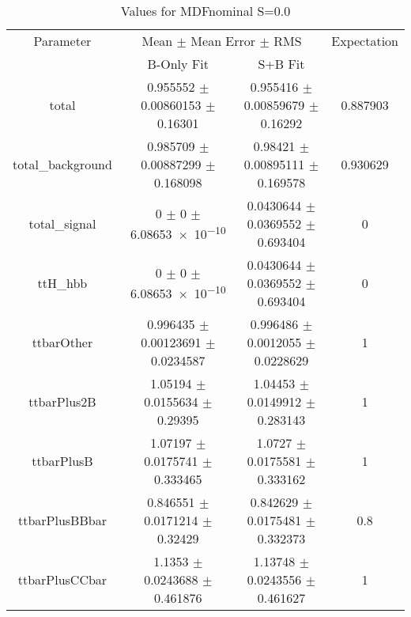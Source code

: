 \begin{table}
\centering
\caption{Values for MDFnominal S=0.0}
\begin{tabular}{cccc}
\toprule
Parameter & \multicolumn{2}{c}{Mean $\pm$ Mean Error $\pm$ RMS} & Expectation\\
 & B-Only Fit & S+B Fit & \\
\midrule
total & \num{0.955552} $\pm$ \num{0.00860153} $\pm$ \num{0.16301} & \num{0.955416} $\pm$ \num{0.00859679} $\pm$ \num{0.16292} & \num{0.887903}\\
total\_background & \num{0.985709} $\pm$ \num{0.00887299} $\pm$ \num{0.168098} & \num{0.98421} $\pm$ \num{0.00895111} $\pm$ \num{0.169578} & \num{0.930629}\\
total\_signal & \num{0} $\pm$ \num{0} $\pm$ \num{6.08653e-10} & \num{0.0430644} $\pm$ \num{0.0369552} $\pm$ \num{0.693404} & \num{0}\\
ttH\_hbb & \num{0} $\pm$ \num{0} $\pm$ \num{6.08653e-10} & \num{0.0430644} $\pm$ \num{0.0369552} $\pm$ \num{0.693404} & \num{0}\\
ttbarOther & \num{0.996435} $\pm$ \num{0.00123691} $\pm$ \num{0.0234587} & \num{0.996486} $\pm$ \num{0.0012055} $\pm$ \num{0.0228629} & \num{1}\\
ttbarPlus2B & \num{1.05194} $\pm$ \num{0.0155634} $\pm$ \num{0.29395} & \num{1.04453} $\pm$ \num{0.0149912} $\pm$ \num{0.283143} & \num{1}\\
ttbarPlusB & \num{1.07197} $\pm$ \num{0.0175741} $\pm$ \num{0.333465} & \num{1.0727} $\pm$ \num{0.0175581} $\pm$ \num{0.333162} & \num{1}\\
ttbarPlusBBbar & \num{0.846551} $\pm$ \num{0.0171214} $\pm$ \num{0.32429} & \num{0.842629} $\pm$ \num{0.0175481} $\pm$ \num{0.332373} & \num{0.8}\\
ttbarPlusCCbar & \num{1.1353} $\pm$ \num{0.0243688} $\pm$ \num{0.461876} & \num{1.13748} $\pm$ \num{0.0243556} $\pm$ \num{0.461627} & \num{1}\\
\bottomrule
\end{tabular}
\end{table}